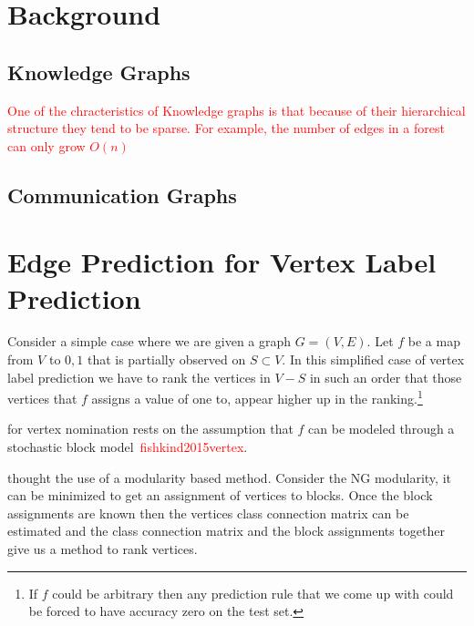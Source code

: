 \documentclass{tufte-handout}
\renewcommand{\cite}[1]{\textcolor{red}{#1}}
\newcommand{\alert}[1]{\textcolor{red}{#1}}
\begin{document}
\section{Background}
\label{sec:background}
\subsection{Knowledge Graphs}
\label{sec:knowledge-graphs}
\alert{One of the chracteristics of Knowledge graphs is that because of their
  hierarchical structure they tend to be sparse. For example, the number of
  edges in a forest can only grow $O(n)$}


\subsection{Communication Graphs}
\label{sec:communication-graphs}


\section{Edge Prediction for Vertex Label Prediction}
\label{sec:edge-for-vertex}
Consider a simple case where we are given a graph $G = (V, E)$.
Let $f$ be a map from $V$ to ${0, 1}$ that is partially observed on $S \subset V$.
In this simplified case of vertex label prediction we have to rank the vertices in $V-S$
in such an order that those vertices that $f$ assigns a value of one to, appear higher up in the
ranking.\footnote{If $f$ could be arbitrary then any prediction rule that we come up with could be
forced to have accuracy zero on the test set.}

 for vertex nomination rests on the assumption that $f$ can be
modeled through a stochastic block model~\cite{fishkind2015vertex}.

 thought the use of a modularity based method.
Consider the NG modularity, it can be minimized to get an assignment of vertices to
blocks. Once the block assignments are known then the vertices class connection matrix
can be estimated and the class connection matrix and the block assignments together
give us a method to rank vertices.
\end{document}
